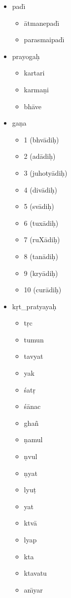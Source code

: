 \documentclass{article}
\begin{document}
\begin{itemize}
\item pad{\=\i}
\begin{itemize}
\item {\=a}tmanepad{\=\i}
\item parasmaipad{\=\i}
\end{itemize}

\item prayoga\d{h}
\begin{itemize}
\item kartari
\item karma\d{n}i
\item bh{\=a}ve
\end{itemize}

\item ga\d{n}a
\begin{itemize}
\item 1  (bhv{\=a}di\d{h})
\item 2  (ad{\=a}di\d{h})
\item 3  (juhoty{\=a}di\d{h})
\item 4  (div{\=a}di\d{h})
\item 5  (sv{\=a}di\d{h})
\item 6  (tux{\=a}di\d{h})
\item 7  (ruX{\=a}di\d{h})
\item 8  (tan{\=a}di\d{h})
\item 9  (kry{\=a}di\d{h})
\item 10 (cur{\=a}di\d{h})
\end{itemize}

\item k\d{r}t\_pratyaya\d{h}
\begin{itemize}
\item t\d{r}c
\item tumun
\item tavyat
\item yak
\item \'{s}at\d{r}
\item \'{s}{\=a}nac
\item gha\~{n}
\item \d{n}amul
\item \d{n}vul
\item \d{n}yat
\item lyu\d{t}
\item yat
\item ktv{\=a}
\item lyap
\item kta
\item ktavatu
\item an{\=\i}yar
\end{itemize}


\end{itemize}
\end{document}
